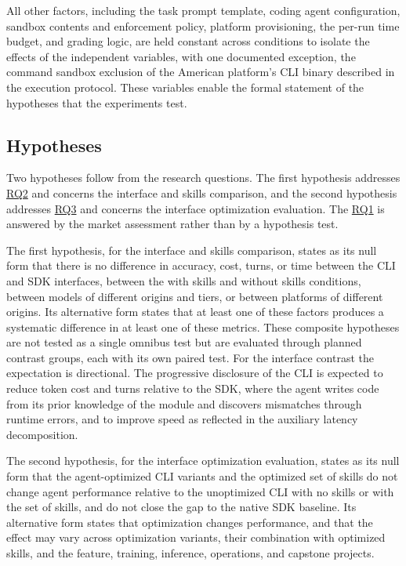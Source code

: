 \documentclass[
english,                 %
bibtex,                  %
]{kththesis}
\numberwithin{listing}{chapter}
\begin{document}
All other factors, including the task prompt template, coding agent configuration, sandbox contents and enforcement policy, platform provisioning, the per-run time budget, and grading logic, are held constant across conditions to isolate the effects of the independent variables, with one documented exception, the command sandbox exclusion of the American platform's \gls{CLI} binary described in the execution protocol. These variables enable the formal statement of the hypotheses that the experiments test.

\subsection{Hypotheses}
\label{sec:method_hypotheses}
\glsresetall

Two hypotheses follow from the research questions. The first hypothesis addresses \hyperref[rq2]{RQ2} and concerns the interface and skills comparison, and the second hypothesis addresses \hyperref[rq3]{RQ3} and concerns the interface optimization evaluation. The \hyperref[rq1]{RQ1} is answered by the market assessment rather than by a hypothesis test.

The first hypothesis, for the interface and skills comparison, states as its null form that there is no difference in accuracy, cost, turns, or time between the \gls{CLI} and \gls{SDK} interfaces, between the with skills and without skills conditions, between models of different origins and tiers, or between platforms of different origins. Its alternative form states that at least one of these factors produces a systematic difference in at least one of these metrics. These composite hypotheses are not tested as a single omnibus test but are evaluated through planned contrast groups, each with its own paired test. For the interface contrast the expectation is directional. The progressive disclosure of the \gls{CLI} is expected to reduce token cost and turns relative to the \gls{SDK}, where the agent writes code from its prior knowledge of the module and discovers mismatches through runtime errors, and to improve speed as reflected in the auxiliary latency decomposition.

The second hypothesis, for the interface optimization evaluation, states as its null form that the agent-optimized \gls{CLI} variants and the optimized set of skills do not change agent performance relative to the unoptimized \gls{CLI} with no skills or with the set of skills, and do not close the gap to the native \gls{SDK} baseline. Its alternative form states that optimization changes performance, and that the effect may vary across optimization variants, their combination with optimized skills, and the feature, training, inference, operations, and capstone projects.
\end{document}
